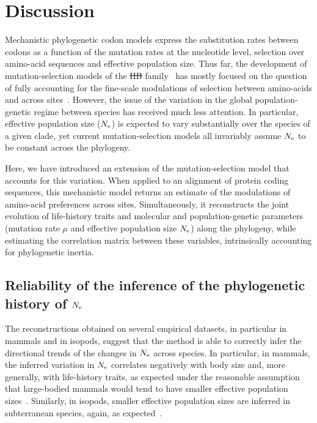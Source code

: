 \documentclass{article}
\providecommand{\DIFaddtex}[1]{{\protect\color{blue}\uwave{#1}}} %
\providecommand{\DIFdeltex}[1]{{\protect\color{red}\sout{#1}}}                      %
\providecommand{\DIFaddbegin}{} %
\providecommand{\DIFaddend}{} %
\providecommand{\DIFdelbegin}{} %
\providecommand{\DIFdelend}{} %
\providecommand{\DIFadd}[1]{\texorpdfstring{\DIFaddtex{#1}}{#1}} %
\providecommand{\DIFdel}[1]{\texorpdfstring{\DIFdeltex{#1}}{}} %
\begin{document}
    \section{Discussion}
    \label{sec:Discussion}
    Mechanistic phylogenetic {codon} models express the {substitution} rates between codons as a function of the mutation rates at the nucleotide level, selection over amino-acid sequences and {effective population size}.
    Thus far, the development of mutation-selection models of the \DIFdelbegin %
\DIFdel{HB}%
\DIFdelend \DIFaddbegin \DIFadd{\mbox{%
\citet{Halpern1998} }\hspace{0pt}%
}\DIFaddend family~\citep{Rodrigue2010, Tamuri2012} has mostly focused on the question of fully accounting for the fine-scale modulations of selection between amino-acids and across sites~\citep{Rodrigue2010, Tamuri2012}.
    However, the issue of the variation in the global population-genetic regime between species has received much less attention.
    In particular, {effective population size} ($N_{\text{e}}$) is expected to vary substantially over the species of a given clade, yet current mutation-selection models all invariably assume $N_{\text{e}}$ to be constant across the phylogeny.

    Here, we have introduced an extension of the mutation-selection model that accounts for this variation.
    When applied to an alignment of protein coding sequences, this mechanistic model returns an estimate of the modulations of amino-acid preferences across sites.
    Simultaneously, it reconstructs the joint evolution of life-history traits and molecular and population-genetic parameters (mutation rate $\mu$ and {effective population size} $N_{\text{e}}$) along the phylogeny, while estimating the correlation matrix between these variables, intrinsically accounting for phylogenetic inertia.

    \subsection{Reliability of the inference of the phylogenetic history of $N_{\text{e}}$}

    The reconstructions obtained on several empirical datasets, in particular in mammals and in isopods, suggest that the method is able to correctly infer the directional trends of the changes in $N_{\text{e}}$ across species.
    In particular, in mammals, the inferred variation in $N_{\text{e}}$ correlates negatively with body size and, more generally, with life-history traits, as expected under the reasonable assumption that large-bodied mammals would tend to have smaller effective population sizes~\cite{Popadin2007,Lartillot2012,Nabholz2013,Figuet2017}.
    Similarly, in isopods, smaller effective population sizes are inferred in subterranean species, again, as expected~\citep{Capderrey2013}.
\end{document}
